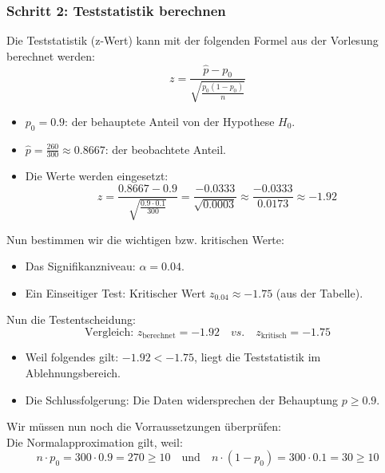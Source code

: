 \documentclass[a4paper]{article}
\begin{document}
\subsubsection*{Schritt 2: Teststatistik berechnen}
Die Teststatistik (z-Wert) kann mit der folgenden Formel aus der Vorlesung berechnet werden:
\[
z = \frac{\hat{p} - p_0}{\sqrt{\frac{p_0(1 - p_0)}{n}}}
\]
\begin{itemize}
    \item \( p_0 = 0.9 \): der behauptete Anteil von der Hypothese \( H_0 \).
    \item \( \hat{p} = \frac{260}{300} \approx 0.8667 \): der beobachtete Anteil.
    \item Die Werte werden eingesetzt:
    \[
    z = \frac{0.8667 - 0.9}{\sqrt{\frac{0.9 \cdot 0.1}{300}}} = \frac{-0.0333}{\sqrt{0.0003}} \approx \frac{-0.0333}{0.0173} \approx -1.92
    \]
\end{itemize}
Nun bestimmen wir die wichtigen bzw. kritischen Werte:
\begin{itemize}
    \item Das Signifikanzniveau: \( \alpha = 0.04 \).
    \item Ein Einseitiger Test: Kritischer Wert \( z_{0.04} \approx -1.75 \) (aus der Tabelle).
\end{itemize}
Nun die Testentscheidung:
\[
\text{Vergleich: } z_{\text{berechnet}} = -1.92 \quad vs. \quad z_{\text{kritisch}} = -1.75
\]
\begin{itemize}
    \item Weil folgendes gilt: \( -1.92 < -1.75 \), liegt die Teststatistik im Ablehnungsbereich.
    \item Die Schlussfolgerung: Die Daten widersprechen der Behauptung \( p \geq 0.9 \).
\end{itemize}
Wir müssen nun noch die Vorraussetzungen überprüfen:\\
Die Normalapproximation gilt, weil:
\[
n \cdot p_0 = 300 \cdot 0.9 = 270 \geq 10 \quad \text{und} \quad n \cdot (1 - p_0) = 300 \cdot 0.1 = 30 \geq 10
\]
\end{document}

